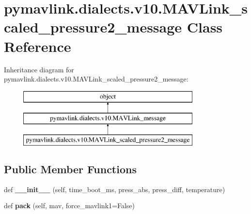 \hypertarget{classpymavlink_1_1dialects_1_1v10_1_1MAVLink__scaled__pressure2__message}{}\section{pymavlink.\+dialects.\+v10.\+M\+A\+V\+Link\+\_\+scaled\+\_\+pressure2\+\_\+message Class Reference}
\label{classpymavlink_1_1dialects_1_1v10_1_1MAVLink__scaled__pressure2__message}
Inheritance diagram for pymavlink.\+dialects.\+v10.\+M\+A\+V\+Link\+\_\+scaled\+\_\+pressure2\+\_\+message\+:\begin{figure}[H]
\begin{center}
\leavevmode
\includegraphics[height=3.000000cm]{classpymavlink_1_1dialects_1_1v10_1_1MAVLink__scaled__pressure2__message}
\end{center}
\end{figure}
\subsection*{Public Member Functions}
\begin{DoxyCompactItemize}
\item 
\mbox{\label{classpymavlink_1_1dialects_1_1v10_1_1MAVLink__scaled__pressure2__message_a816916092caff5586b2ae8e48ee42dee}} 
def {\bfseries \+\_\+\+\_\+init\+\_\+\+\_\+} (self, time\+\_\+boot\+\_\+ms, press\+\_\+abs, press\+\_\+diff, temperature)
\item 
\mbox{\label{classpymavlink_1_1dialects_1_1v10_1_1MAVLink__scaled__pressure2__message_a694d837cd3cba3bca1057a1c423d7d93}} 
def {\bfseries pack} (self, mav, force\+\_\+mavlink1=False)
\end{DoxyCompactItemize}
